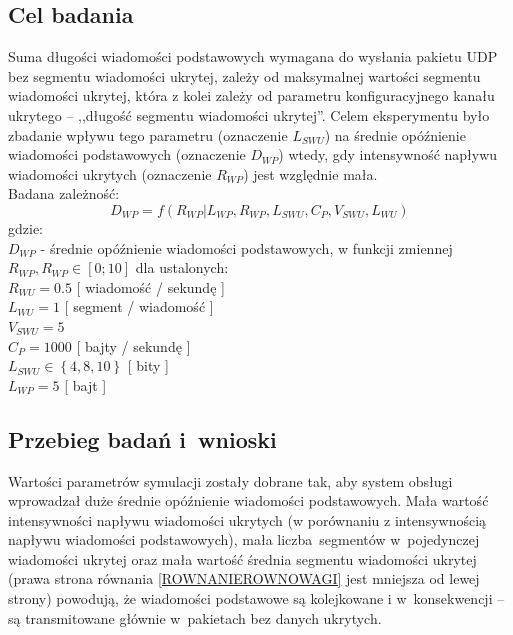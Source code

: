 \documentclass[a4paper, twoside, openright, 12pt]{report}
\begin{document}
        \subsection{Cel badania}
            Suma długości wiadomości podstawowych wymagana do wysłania pakietu UDP
            bez segmentu wiadomości ukrytej,
            zależy od maksymalnej wartości segmentu wiadomości ukrytej, która
            z kolei zależy od parametru konfiguracyjnego kanału ukrytego -- ,,długość segmentu wiadomości ukrytej''.
            Celem eksperymentu było zbadanie wpływu tego parametru (oznaczenie \(L_{SWU}\))
            na średnie opóźnienie wiadomości podstawowych (oznaczenie \( D_{WP} \))
            wtedy, gdy intensywność napływu wiadomości ukrytych (oznaczenie \( R_{WP} \)) jest względnie mała.
            \\
            Badana zależność: \\
                $$ D_{WP} = f(R_{WP} | L_{WP}, R_{WP}, L_{SWU}, C_P, V_{SWU}, L_{WU}) $$
            gdzie: \\
                \( D_{WP} \) - średnie opóźnienie wiadomości podstawowych, w funkcji zmiennej \( R_{WP}, R_{WP} \in [0;10] \)
           dla ustalonych: \\
                \( R_{WU} = 0.5 \) [ wiadomość / sekundę ]\\
                \( L_{WU} = 1 \) [ segment / wiadomość ]\\
                \( V_{SWU} = 5 \)\\
                \( C_P = 1000 \) [ bajty / sekundę ]\\
                \( L_{SWU} \in \left\{4, 8, 10\right\}\) [ bity ]\\
                \( L_{WP} = 5 \) [ bajt ]\\
        \subsection{Przebieg badań i~wnioski}
            Wartości parametrów symulacji zostały dobrane tak, aby system obsługi
            wprowadzał duże średnie opóźnienie wiadomości podstawowych. Mała wartość intensywności
            napływu wiadomości ukrytych (w porównaniu z intensywnością napływu wiadomości podstawowych),
            mała liczba segmentów w~pojedynczej
            wiadomości ukrytej oraz mała wartość średnia segmentu
            wiadomości ukrytej (prawa strona równania \ref{ROWNANIEROWNOWAGI} jest mniejsza od lewej strony)
            powodują, że wiadomości podstawowe są kolejkowane i
            w~konsekwencji -- są transmitowane głównie w~pakietach bez danych ukrytych.
\end{document}
